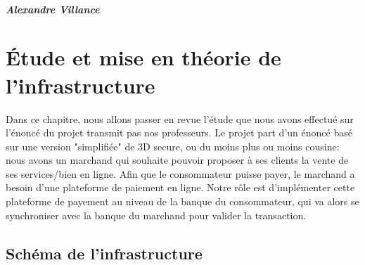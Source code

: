 \paragraph{Alexandre Villance}

\chapter{Étude et mise en théorie de l'infrastructure}

Dans ce chapitre, nous allons passer en revue l'étude que nous avons effectué sur l'énoncé du projet transmit pas nos professeurs. Le projet part d'un énoncé basé sur une version "simplifiée" de 3D secure, ou du moins plus ou moins cousine: nous avons un marchand qui souhaite pouvoir proposer à ses clients la vente de ses services/bien en ligne. Afin que le consommateur puisse payer, le marchand a besoin d'une plateforme de paiement en ligne. Notre rôle est d'implémenter cette plateforme de payement au niveau de la banque du consommateur, qui va alors se synchroniser avec la banque du marchand pour valider la transaction.

\section{Schéma de l'infrastructure}
